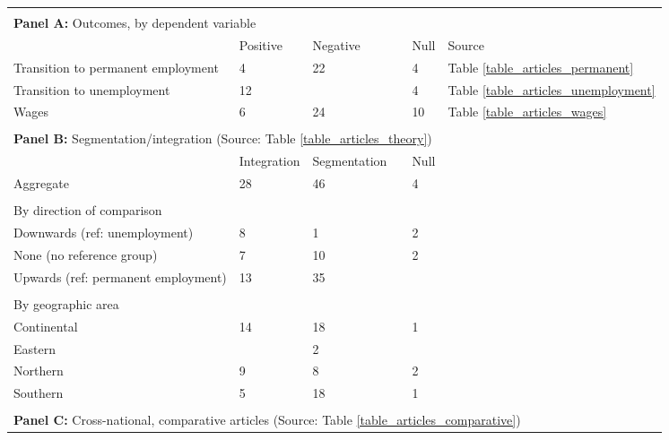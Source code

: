 \begin{tabular}{llllll}
   \\[-1.8ex]\hline\hline \\[-1.8ex] 
 \multicolumn{6}{l}{{\bf Panel A:} Outcomes, by dependent variable} \\ 

                     \phantom{Column1} & Positive     & Negative      & \phantom{Mixed}  & Null  & Source \\ \cmidrule(lr){2-6}Transition to permanent employment &  4 & 22 &  &  4 & Table \ref{table_articles_permanent} \\ 
  Transition to unemployment & 12 &  &  &  4 & Table \ref{table_articles_unemployment} \\ 
  Wages &  6 & 24 &  & 10 & Table \ref{table_articles_wages} \\ 
   \hline \\[-1.8ex]   
                     \multicolumn{6}{l}{{\bf Panel B:} Segmentation/integration (Source: Table \ref{table_articles_theory})} \\ 

                     \phantom{Column1} & Integration  & Segmentation  & \phantom{Mixed}  & Null  & \phantom{Source} \\  \cmidrule(lr){2-5}Aggregate & 28 & 46 &  & 4 &  \\ 
  \\[-1.8ex]   
                     By direction of comparison \\
                      \hspace{10mm} Downwards (ref: unemployment) &  8 &  1 &  & 2 &  \\ 
  \hspace{10mm} None (no reference group) &  7 & 10 &  & 2 &  \\ 
  \hspace{10mm} Upwards (ref: permanent employment) & 13 & 35 &  &  &  \\ 
  \\[-1.8ex]   
                     By geographic area \\
                      \hspace{10mm} Continental & 14 & 18 &  & 1 &  \\ 
  \hspace{10mm} Eastern &  &  2 &  &  &  \\ 
  \hspace{10mm} Northern &  9 &  8 &  & 2 &  \\ 
  \hspace{10mm} Southern &  5 & 18 &  & 1 &  \\ 
   \hline \\[-1.8ex]   
                     \multicolumn{6}{l}{{\bf Panel C:} Cross-national, comparative articles (Source: Table \ref{table_articles_comparative})} \\ 


\end{tabular}
